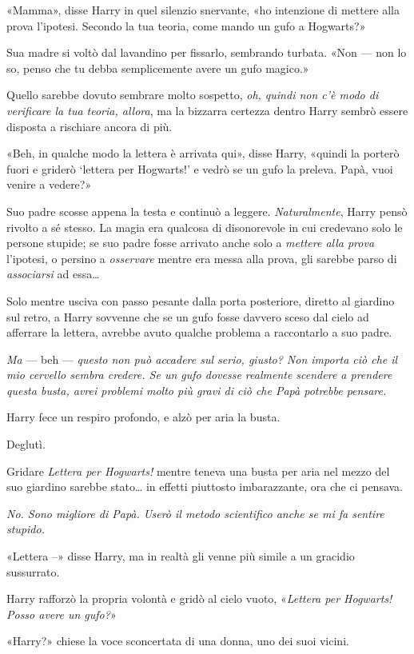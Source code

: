 «Mamma», disse Harry in quel silenzio snervante, «ho intenzione di mettere alla prova l’ipotesi. Secondo la tua teoria, come mando un gufo a Hogwarts?»

Sua madre si voltò dal lavandino per fissarlo, sembrando turbata. «Non — non lo so, penso che tu debba semplicemente avere un gufo magico.»

Quello sarebbe dovuto sembrare molto sospetto, \emph{oh, quindi non c’è modo di verificare la tua teoria, allora}, ma la bizzarra certezza dentro Harry sembrò essere disposta a rischiare ancora di più.

«Beh, in qualche modo la lettera è arrivata qui», disse Harry, «quindi la porterò fuori e griderò ‘lettera per Hogwarts!’ e vedrò se un gufo la preleva. Papà, vuoi venire a vedere?»

Suo padre scosse appena la testa e continuò a leggere. \emph{Naturalmente}, Harry pensò rivolto a sé stesso. La magia era qualcosa di disonorevole in cui credevano solo le persone stupide; se suo padre fosse arrivato anche solo a \emph{mettere alla prova} l’ipotesi, o persino a \emph{osservare} mentre era messa alla prova, gli sarebbe parso di \emph{associarsi} ad essa…

Solo mentre usciva con passo pesante dalla porta posteriore, diretto al giardino sul retro, a Harry sovvenne che se un gufo fosse davvero sceso dal cielo ad afferrare la lettera, avrebbe avuto qualche problema a raccontarlo a suo padre.

\emph{Ma} — beh — \emph{questo non può accadere sul serio, giusto? Non importa ciò che il mio cervello sembra credere. Se un gufo dovesse realmente scendere a prendere questa busta, avrei problemi molto più gravi di ciò che Papà potrebbe pensare.}

Harry fece un respiro profondo, e alzò per aria la busta.

Deglutì.

Gridare \emph{Lettera per Hogwarts!} mentre teneva una busta per aria nel mezzo del suo giardino sarebbe stato… in effetti piuttosto imbarazzante, ora che ci pensava.

\emph{No. Sono migliore di Papà. Userò il metodo scientifico anche se mi fa sentire stupido.}

«Lettera –» disse Harry, ma in realtà gli venne più simile a un gracidio sussurrato.

Harry rafforzò la propria volontà e gridò al cielo vuoto, «\emph{Lettera per Hogwarts! Posso avere un gufo?}»

«Harry?» chiese la voce sconcertata di una donna, uno dei suoi vicini.

